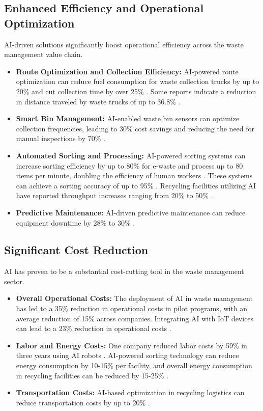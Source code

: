 \subsection{Enhanced Efficiency and Operational Optimization}
AI-driven solutions significantly boost operational efficiency across the waste management value chain.
\begin{itemize}
    \item \textbf{Route Optimization and Collection Efficiency:} AI-powered route optimization can reduce fuel consumption for waste collection trucks by up to 20\% and cut collection time by over 25\% \cite{Zipdo_Benefits_1, DVOTeam_Benefits}. Some reports indicate a reduction in distance traveled by waste trucks of up to 36.8\% \cite{Wifitalents_Benefits}.
    \item \textbf{Smart Bin Management:} AI-enabled waste bin sensors can optimize collection frequencies, leading to 30\% cost savings and reducing the need for manual inspections by 70\% \cite{Zipdo_Benefits_1}.
    \item \textbf{Automated Sorting and Processing:} AI-powered sorting systems can increase sorting efficiency by up to 80\% for e-waste and process up to 80 items per minute, doubling the efficiency of human workers \cite{SustainabilityDirectory_Benefits_1, Forbes_Benefits}. These systems can achieve a sorting accuracy of up to 95\% \cite{SustainabilityLinkedIn_Benefits_1}. Recycling facilities utilizing AI have reported throughput increases ranging from 20\% to 50\% \cite{SustainabilityDirectory_Benefits_2}.
    \item \textbf{Predictive Maintenance:}
AI-driven predictive maintenance can reduce equipment downtime by 28\% to 30\% \cite{Zipdo_Benefits_1, RecyclingToday_Benefits}.
\end{itemize}

\subsection{Significant Cost Reduction}
AI has proven to be a substantial cost-cutting tool in the waste management sector.
\begin{itemize}
    \item \textbf{Overall Operational Costs:} The deployment of AI in waste management has led to a 35\% reduction in operational costs in pilot programs, with an average reduction of 15\% across companies. Integrating AI with IoT devices can lead to a 23\% reduction in operational costs \cite{Zipdo_Benefits_1}.
    \item \textbf{Labor and Energy Costs:} One company reduced labor costs by 59\% in three years using AI robots \cite{Forbes_Benefits}. AI-powered sorting technology can reduce energy consumption by 10-15\% per facility, and overall energy consumption in recycling facilities can be reduced by 15-25\% \cite{Zipdo_Benefits_2, CWME_Benefits}.
    \item \textbf{Transportation Costs:} AI-based optimization in recycling logistics can reduce transportation costs by up to 20\% \cite{Zipdo_Benefits_2}.
\end{itemize}


